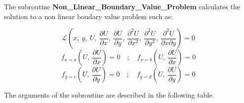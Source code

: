 The subroutine \textbf{Non\_Linear\_Boundary\_Value\_Problem} calculates the solution to a non linear boudary value problem such as:

\begin{equation*}
\mathscr{L}\left(x,\ y,\ U, \ \frac{\partial U}{\partial x}, \ \frac{\partial U}{\partial y}, \ \frac{\partial^2 U}{\partial x^2}, \ \frac{\partial^2 U}{\partial y^2}, \ \frac{\partial^2 U}{\partial x \partial y} \right) = 0
\end{equation*}
\begin{equation*}
f_{x=a}\left(U, \ \frac{\partial U}{\partial x}\right)=0  \quad ; \quad f_{x=b}\left(U, \ \frac{\partial U}{\partial x}\right)=0  
\end{equation*}
\begin{equation*}
f_{y=c}\left(U, \ \frac{\partial U}{\partial y}\right)=0  \quad ; \quad f_{y=d}\left(U, \ \frac{\partial U}{\partial y}\right)=0  
\end{equation*}



The arguments of the subroutine are described in the following table.

